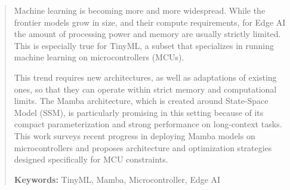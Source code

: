 \begin{abstract}

  Machine learning is becoming more and more widespread. While the frontier models grow in size, and their compute requirements, for Edge AI the amount of processing power and memory are usually strictly limited. This is especially true for TinyML, a subset that specializes in running machine learning on microcontrollers (MCUs).

  This trend requires new architectures, as well as adaptations of existing ones, so that they can operate within strict memory and computational limits. The Mamba architecture, which is created around State-Space Model (SSM), is particularly promising in this setting because of its compact parameterization and strong performance on long-context tasks. This work surveys recent progress in deploying Mamba models on microcontrollers and proposes architecture and optimization strategies designed specifically for MCU constraints.

  \textbf{Keywords:}
  TinyML, Mamba, Microcontroller, Edge AI

\end{abstract}